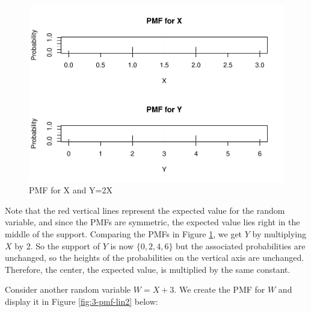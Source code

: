\documentclass[
]{book}
\begin{document}
\begin{figure}
\centering
\includegraphics{bookdown-demo_files/figure-latex/3-pmf-lin-1.pdf}
\caption{\label{fig:3-pmf-lin}PMF for X and Y=2X}
\end{figure}

Note that the red vertical lines represent the expected value for the random variable, and since the PMFs are symmetric, the expected value lies right in the middle of the support. Comparing the PMFs in Figure \ref{fig:3-pmf-lin}, we get \(Y\) by multiplying \(X\) by 2. So the support of \(Y\) is now \(\{0,2,4,6\}\) but the associated probabilities are unchanged, so the heights of the probabilities on the vertical axis are unchanged. Therefore, the center, the expected value, is multiplied by the same constant.

Consider another random variable \(W = X+3\). We create the PMF for \(W\) and display it in Figure \ref{fig:3-pmf-lin2} below:
\end{document}
